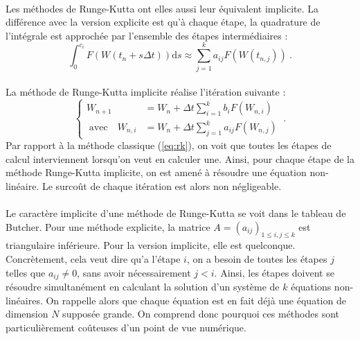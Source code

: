     \paragraph{}
    Les méthodes de Runge-Kutta ont elles aussi leur équivalent implicite.
    La différence avec la version explicite est qu'à chaque étape, la quadrature de l'intégrale est approchée par l'ensemble des étapes intermédiaires :
    \[\int_0^{c_i}F\left(W\left(t_n + s\Delta t\right)\right)\mathrm{d}s \approx \sum_{j = 1}^ka_{ij}F\left(W\left(t_{n,j}\right)\right)\ .\]

    \paragraph{}
    La méthode de Runge-Kutta implicite réalise l'itération suivante :
    \begin{equation}\label{eq:rk_impl}
      \left\{\begin{aligned}
        W_{n+1} &= W_n + \Delta t\sum_{i = 1}^kb_iF\left(W_{n,i}\right) \\
        \;\textrm{avec}\quad W_{n,i} &= W_n + \Delta t \sum_{j = 1}^ka_{ij}F\left(W_{n,j}\right)
      \end{aligned}\right.\ .
    \end{equation}
    Par rapport à la méthode classique (\ref{eq:rk}), on voit que toutes les étapes de calcul interviennent lorsqu'on veut en calculer une.
    Ainsi, pour chaque étape de la méthode Runge-Kutta implicite, on est amené à résoudre une équation non-linéaire.
    Le surcoût de chaque itération est alors non négligeable.

    \paragraph{}
    Le caractère implicite d'une méthode de Runge-Kutta se voit dans le tableau de Butcher.
    Pour une méthode explicite, la matrice $A = \left(a_{ij}\right)_{1\leq i, j\leq k}$ est triangulaire inférieure.
    Pour la version implicite, elle est quelconque.
    Concrètement, cela veut dire qu'a l'étape $i$, on a besoin de toutes les étapes $j$ telles que $a_{ij}\neq 0$, sans avoir nécessairement $j < i$.
    Ainsi, les étapes doivent se résoudre simultanément en calculant la solution d'un système de $k$ équations non-linéaires.
    On rappelle alors que chaque équation est en fait déjà une équation de dimension $N$ supposée grande.
    On comprend donc pourquoi ces méthodes sont particulièrement coûteuses d'un point de vue numérique.

